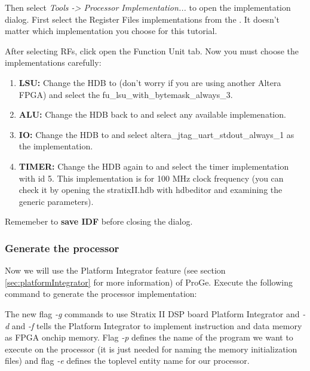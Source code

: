 \documentclass[twoside]{tceusermanual}
\begin{document}

Then select \textit{Tools -> Processor Implementation...} to open the
implementation dialog. First select the Register Files implementations
from the . It doesn't matter which
implementation you choose for this tutorial.

After selecting RFs, click open the Function Unit tab. Now you must
choose the implementations carefully:

\begin{enumerate}
\item%
\textbf{LSU:} Change the HDB to  (don't worry if you are
using another Altera FPGA) and select the
fu\_lsu\_with\_bytemask\_always\_3.

\item%
\textbf{ALU:} Change the HDB back to  and
select any available implemenation.

\item%
\textbf{IO:} Change the HDB to  and select
altera\_jtag\_uart\_stdout\_always\_1 as the implementation.

\item%
\textbf{TIMER:} Change the HDB again to  and select
the timer implementation with id 5. This implementation is for 100 MHz
clock frequency (you can check it by opening the stratixII.hdb with
hdbeditor and examining the generic parameters).
\end{enumerate}

Rememeber to \textbf{save IDF} before closing the dialog.


\subsubsection{Generate the processor}
\label{tut:fpga_stdout_gen_proc}

Now we will use the Platform Integrator feature (see section
\ref{sec:platformIntegrator} for more information) of ProGe. Execute
the following command to generate the processor implementation:


The new flag \textit{-g} commands to use Stratix II DSP board Platform
Integrator and \textit{-d} and \textit{-f} tells the Platform
Integrator to implement instruction and data memory as FPGA onchip
memory. Flag \textit{-p} defines the name of the program we want to
execute on the processor (it is just needed for naming the memory
initialization files) and flag \textit{-e} defines the toplevel entity
name for our processor.
\end{document}
